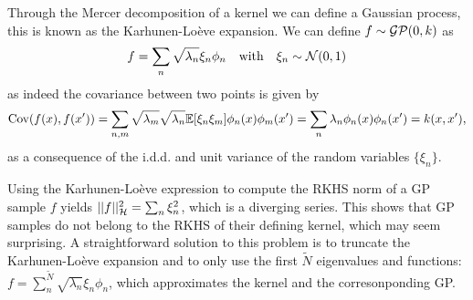 Through the Mercer decomposition of a kernel we can define a Gaussian process, this is known as the Karhunen-Lo\`eve expansion. We can define $f \sim \mathcal{GP}(0, k)$ as
\begin{equation}
    f = \sum_n \sqrt{\lambda_n} \xi_n \phi_n\quad\text{with}\quad\xi_n \sim \NormDist{0, 1}
\end{equation}
as indeed the covariance between two points is given by
\begin{equation}
  \mathrm{Cov}(f(x), f(x')) = \sum_{n,m} \sqrt{\lambda_m} \sqrt{\lambda_n} \mathbb{E}[\xi_n \xi_m] \phi_n(x) \phi_m(x') = \sum_n \lambda_n \phi_n(x) \phi_n(x') = k(x, x'),
\end{equation}
as a consequence of the i.d.d. and unit variance of the random variables $\{\xi_n\}$.

Using the  Karhunen-Lo\`eve expression to compute the RKHS norm of a GP sample $f$ yields $\lvert\lvert f\rvert\rvert^2_{{\mathcal{H}}} = \sum_{n} \xi_{n}^2$, which is a diverging series. This shows that GP samples do not belong to the RKHS of their defining kernel, which may seem surprising. A straightforward solution to this problem is to truncate the Karhunen-Lo\`eve expansion and to only use the first $\tilde{N}$ eigenvalues and functions: $f = \sum_n^{\tilde{N}} \sqrt{\lambda_n} \xi_n \phi_n$, which approximates the kernel and the corresonponding GP.


